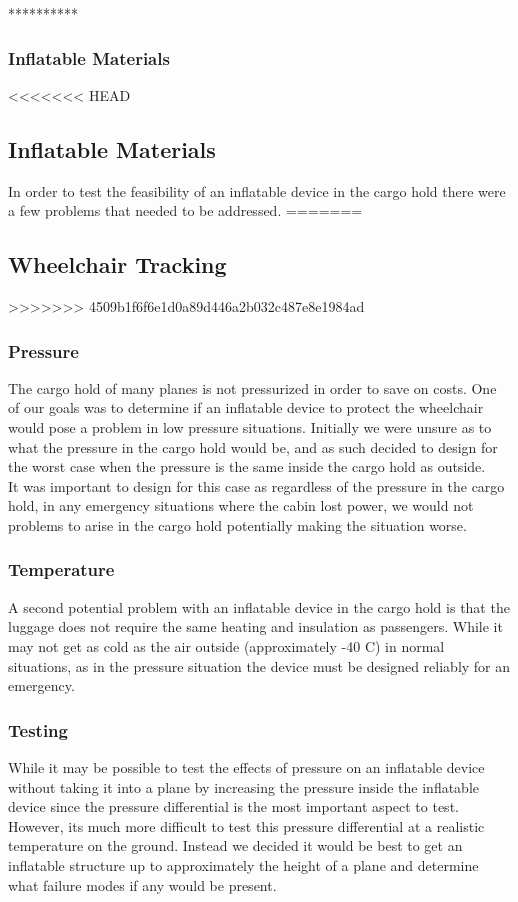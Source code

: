 **********


\subsubsection{Inflatable Materials}

<<<<<<< HEAD
\subsection{Inflatable Materials}
In order to test the feasibility of an inflatable device in the cargo hold there were a few problems that needed to be addressed. 
=======
\subsection{Wheelchair Tracking}
>>>>>>> 4509b1f6f6e1d0a89d446a2b032c487e8e1984ad

\subsubsection{Pressure}
The cargo hold of many planes is not pressurized in order to save on costs. One of our goals was to determine if an inflatable device to protect the wheelchair would pose a problem in low pressure situations. Initially we were unsure as to what the pressure in the cargo hold would be, and as such decided to design for the worst case when the pressure is the same inside the cargo hold as outside. \\

It was important to design for this case as regardless of the pressure in the cargo hold, in any emergency situations where the cabin lost power, we would not problems to arise in the cargo hold potentially making the situation worse.

\subsubsection{Temperature}
A second potential problem with an inflatable device in the cargo hold is that the luggage does not require the same heating and insulation as passengers. While it may not get as cold as the air outside (approximately -40 C) in normal situations, as in the pressure situation the device must be designed reliably for an emergency. \\

\subsubsection{Testing}
While it may be possible to test the effects of pressure on an inflatable device without taking it into a plane by increasing the pressure inside the inflatable device since the pressure differential is the most important aspect to test. However, its much more difficult to test this pressure differential at a realistic temperature on the ground. Instead we decided it would be best to get an inflatable structure up to approximately the height of a plane and determine what failure modes if any would be present. \\

